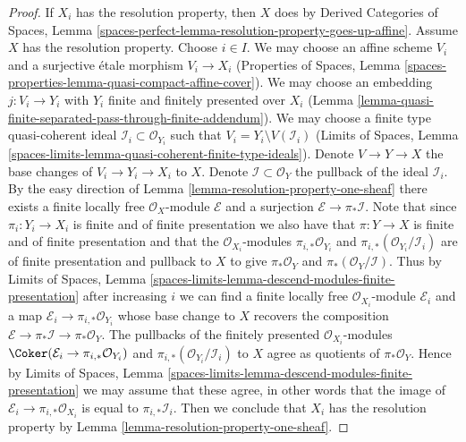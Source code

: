 \begin{proof}
If $X_i$ has the resolution property, then $X$ does by
Derived Categories of Spaces, Lemma
\ref{spaces-perfect-lemma-resolution-property-goes-up-affine}.
Assume $X$ has the resolution property.
Choose $i \in I$. We may choose an affine scheme $V_i$ and a surjective
\'etale morphism $V_i \to X_i$ 
(Properties of Spaces, Lemma
\ref{spaces-properties-lemma-quasi-compact-affine-cover}).
We may choose an embedding $j : V_i \to Y_i$
with $Y_i$ finite and finitely presented over $X_i$
(Lemma \ref{lemma-quasi-finite-separated-pass-through-finite-addendum}).
We may choose a finite type
quasi-coherent ideal $\mathcal{I}_i \subset \mathcal{O}_{Y_i}$
such that $V_i = Y_i \setminus V(\mathcal{I}_i)$
(Limits of Spaces, Lemma
\ref{spaces-limits-lemma-quasi-coherent-finite-type-ideals}).
Denote $V \to Y \to X$ the base changes of $V_i \to Y_i \to X_i$
to $X$. Denote $\mathcal{I} \subset \mathcal{O}_Y$ the pullback
of the ideal $\mathcal{I}_i$. By the easy direction of
Lemma \ref{lemma-resolution-property-one-sheaf}
there exists a finite locally free $\mathcal{O}_X$-module
$\mathcal{E}$ and a surjection $\mathcal{E} \to \pi_*\mathcal{I}$.
Note that since $\pi_i : Y_i \to X_i$ is finite and of finite presentation
we also have that $\pi : Y \to X$ is finite and of finite presentation
and that the $\mathcal{O}_{X_i}$-modules
$\pi_{i, *}\mathcal{O}_{Y_i}$ and
$\pi_{i, *}(\mathcal{O}_{Y_i}/\mathcal{I}_i)$
are of finite presentation and pullback to $X$ to give
$\pi_*\mathcal{O}_Y$ and
$\pi_*(\mathcal{O}_Y/\mathcal{I})$. Thus by Limits of Spaces, Lemma
\ref{spaces-limits-lemma-descend-modules-finite-presentation}
after increasing $i$ we can find a finite locally free
$\mathcal{O}_{X_i}$-module $\mathcal{E}_i$
and a map $\mathcal{E}_i \to \pi_{i, *}\mathcal{O}_{Y_i}$
whose base change to $X$ recovers the composition
$\mathcal{E} \to \pi_*\mathcal{I} \to \pi_*\mathcal{O}_Y$.
The pullbacks of the finitely presented $\mathcal{O}_{X_i}$-modules
$\Coker(\mathcal{E}_i \to \pi_{i, *}\mathcal{O}_{Y_i})$
and $\pi_{i, *}(\mathcal{O}_{Y_i}/\mathcal{I}_i)$
to $X$ agree as quotients of $\pi_*\mathcal{O}_Y$.
Hence by Limits of Spaces, Lemma
\ref{spaces-limits-lemma-descend-modules-finite-presentation}
we may assume that these agree, in other words that
the image of $\mathcal{E}_i \to \pi_{i, *}\mathcal{O}_{X_i}$
is equal to $\pi_{i, *}\mathcal{I}_i$.
Then we conclude that $X_i$ has the resolution property by
Lemma \ref{lemma-resolution-property-one-sheaf}.
\end{proof}

